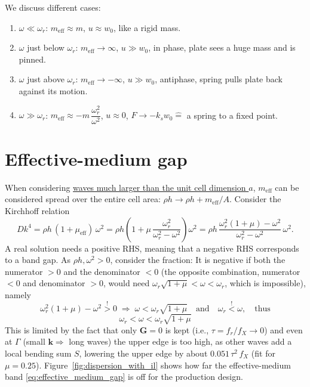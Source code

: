 We discuss different cases:
\begin{enumerate}
  \item $\omega \ll \omega_r$: $m_\mathrm{eff} \approx m$, $u \approx w_0$, like a
        rigid mass.
  \item $\omega$ just below $\omega_r$: $m_\mathrm{eff} \to \infty$,
        $u \gg w_0$, in phase, plate sees a huge mass and is pinned.
  \item $\omega$ just above $\omega_r$: $m_\mathrm{eff} \to -\infty$,
        $u \gg w_0$, antiphase, spring pulls plate back against its motion.
  \item $\omega \gg \omega_r$: $m_\mathrm{eff} \approx -m\,\dfrac{\omega_r^2}{\omega^2}$,
        $u \approx 0$, $F \to -k_s w_0 \mathrel{\widehat{=}}$ a spring to a fixed point.
\end{enumerate}

\section{Effective-medium gap}

When considering \underline{waves much larger than the unit cell dimension $a$},
$m_\mathrm{eff}$ can be considered spread over the entire cell area:
$\rho h \to \rho h + m_\mathrm{eff}/A$.
Consider the Kirchhoff relation
\begin{equation}
  D k^4 = \rho h\,(1 + \mu_\mathrm{eff})\,\omega^2
  = \rho h\left(1 + \mu\,\frac{\omega_r^2}{\omega_r^2 - \omega^2}\right)\omega^2
  = \rho h\,\frac{\omega_r^2(1+\mu) - \omega^2}{\omega_r^2 - \omega^2}\,\omega^2 .
\end{equation}
A real solution needs a positive RHS, meaning that a negative RHS corresponds to
a band gap. As $\rho h, \omega^2 > 0$, consider the fraction: It is negative if
both the numerator $> 0$ and the denominator $< 0$ (the opposite
combination, numerator $< 0$ and denominator $> 0$, would need
$\omega_r\sqrt{1+\mu} < \omega < \omega_r$, which is impossible),
namely
\begin{equation}
  \omega_r^2(1+\mu) - \omega^2 \overset{!}{>} 0
  \;\Rightarrow\; \omega < \omega_r\sqrt{1+\mu}
  \quad\text{and}\quad
  \omega_r \overset{!}{<} \omega ,
  \quad\text{thus}
\end{equation}
\begin{equation}
  \boxed{\;\omega_r < \omega < \omega_r\sqrt{1+\mu}}\;
  \label{eq:effective_medium_gap}
\end{equation}
This is limited by the fact that only $\mathbf{G} = 0$ is kept (i.e.,
$\tau = f_r/f_X \to 0$) and even at $\Gamma$ (small $\mathbf{k} \Rightarrow$
long waves) the upper edge is too high, as other waves add a local bending sum
$S$, lowering the upper edge by about $0.051\,\tau^2$$\,f_X$ (fit for
$\mu = 0.25$).
Figure~\ref{fig:dispersion_with_il} shows how far the effective-medium band
\eqref{eq:effective_medium_gap} is off for the production design.

